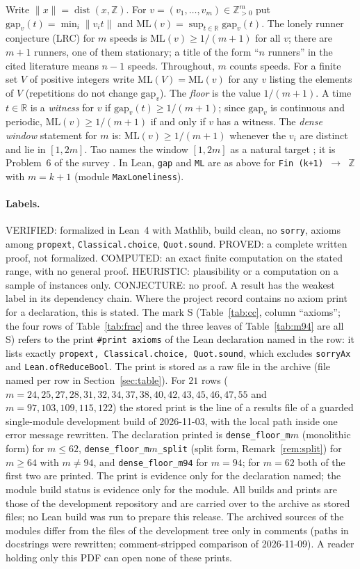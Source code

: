 \documentclass[11pt]{article}
\theoremstyle{remark}
\newcommand{\norm}[1]{\lVert #1\rVert}
\newcommand{\ML}{\mathrm{ML}}
\newcommand{\gap}{\mathrm{gap}}
\newcommand{\Z}{\mathbb{Z}}
\newcommand{\R}{\mathbb{R}}
\begin{document}
Write $\norm{x}=\operatorname{dist}(x,\Z)$. For $v=(v_1,\dots,v_m)\in\Z_{>0}^m$ put $\gap_v(t)=\min_i\norm{v_it}$ and $\ML(v)=\sup_{t\in\R}\gap_v(t)$. The lonely runner conjecture (LRC) for $m$ speeds is $\ML(v)\ge 1/(m+1)$ for all $v$; there are $m+1$ runners, one of them stationary; a title of the form ``$n$ runners'' in the cited literature means $n-1$ speeds. Throughout, $m$ counts speeds. For a finite set $V$ of positive integers write $\ML(V)=\ML(v)$ for any $v$ listing the elements of $V$ (repetitions do not change $\gap_v$). The \emph{floor} is the value $1/(m+1)$. A time $t\in\R$ is a \emph{witness} for $v$ if $\gap_v(t)\ge1/(m+1)$; since $\gap_v$ is continuous and periodic, $\ML(v)\ge1/(m+1)$ if and only if $v$ has a witness. The \emph{dense window} statement for $m$ is: $\ML(v)\ge1/(m+1)$ whenever the $v_i$ are distinct and lie in $[1,2m]$. Tao names the window $[1,2m]$ as a natural target \cite{TaoBlog}; it is Problem~6 of the survey \cite{PS25}. In Lean, \texttt{gap} and \texttt{ML} are as above for \texttt{Fin (k+1) $\to$ $\Z$} with $m=k+1$ (module \texttt{MaxLoneliness}).

\paragraph{Labels.} VERIFIED: formalized in Lean~4 with Mathlib, build clean, no \texttt{sorry}, axioms among \texttt{propext}, \texttt{Classical.choice}, \texttt{Quot.sound}. PROVED: a complete written proof, not formalized. COMPUTED: an exact finite computation on the stated range, with no general proof. HEURISTIC: plausibility or a computation on a sample of instances only. CONJECTURE: no proof. A result has the weakest label in its dependency chain. Where the project record contains no axiom print for a declaration, this is stated. The mark S (Table~\ref{tab:cc}, column ``axioms''; the four rows of Table~\ref{tab:frac} and the three leaves of Table~\ref{tab:m94} are all S) refers to the print \texttt{\#print axioms} of the Lean declaration named in the row: it lists exactly \texttt{propext, Classical.choice, Quot.sound}, which excludes \texttt{sorryAx} and \texttt{Lean.ofReduceBool}. The print is stored as a raw file in the archive (file named per row in Section~\ref{sec:table}). For $21$ rows ($m=24,25,27,28,31,32,34,37,38,40,42,43,45,46,47,55$ and $m=97,103,109,115,122$) the stored print is the line of a results file of a guarded single-module development build of 2026-11-03, with the local path inside one error message rewritten. The declaration printed is \texttt{dense\_floor\_m$m$} (monolithic form) for $m\le62$, \texttt{dense\_floor\_m$m$\_split} (split form, Remark~\ref{rem:split}) for $m\ge64$ with $m\ne94$, and \texttt{dense\_floor\_m94} for $m=94$; for $m=62$ both of the first two are printed. The print is evidence only for the declaration named; the module build status is evidence only for the module. All builds and prints are those of the development repository and are carried over to the archive as stored files; no Lean build was run to prepare this release. The archived sources of the modules differ from the files of the development tree only in comments (paths in docstrings were rewritten; comment-stripped comparison of 2026-11-09). A reader holding only this PDF can open none of these prints.
\end{document}
